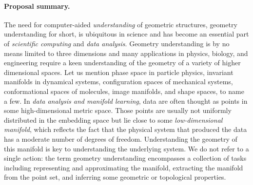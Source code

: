 


\paragraph{Proposal summary.} 

The need for computer-aided {\em understanding} of geometric structures, geometry understanding for short, is ubiquitous in science and has become an essential part of {\em scientific computing} and {\em data analysis}. Geometry understanding is by no means limited to three dimensions and many applications in physics, biology, and engineering require a keen understanding of the geometry of a variety of higher dimensional spaces. Let us mention phase space in particle physics, invariant manifolds in dynamical systems, configuration spaces of mechanical systems, conformational spaces of molecules, image manifolds, and shape spaces, to name a few. In {\em data analysis and manifold learning}, data are often thought as points in some high-dimensional metric space. Those points are usually not uniformly distributed in the embedding space but lie close to some {\em low-dimensional manifold}, which reflects the fact that the physical system that produced the data has a moderate number of degrees of freedom.  Understanding the geometry of this manifold is key to understanding the underlying system. We do not refer to a single action: the term geometry understanding encompasses a collection of tasks including representing and approximating the manifold, extracting the manifold from the point set, and inferring some geometric or topological properties.

